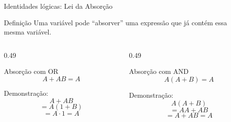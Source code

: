 
\begin{frame}{Identidades lógicas: Lei da Absorção}
    \small

    \begin{block}{Definição}
        Uma variável pode ``absorver'' uma expressão que já contém 
        essa mesma variável.
    \end{block}

    \begin{columns}[T]

        \small
        \begin{column}{0.49\textwidth}
            \begin{block}{Absorção com OR}
                \[
                    \boxed{A + AB = A}
                \]

                Demonstração:
                \[
                    A + AB
                \]
                \[
                    = A(1+B)
                \]
                \[
                    = A\cdot1 = \boxed{A}
                \]
            \end{block}
        \end{column}

        \small
        \begin{column}{0.49\textwidth}
            \begin{block}{Absorção com AND}
                \[
                    \boxed{A(A+B)=A}
                \]

                Demonstração:
                \[
                    A(A+B)
                \]
                \[
                    = AA+AB
                \]
                \[
                    = A+AB = \boxed{A}
                \]
            \end{block}
        \end{column}

    \end{columns}

\end{frame}
